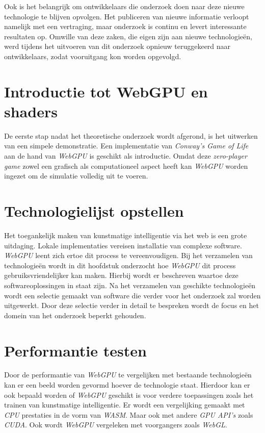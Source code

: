 \bigbreak{}

Ook is het belangrijk om ontwikkelaars die onderzoek doen naar deze nieuwe technologie te blijven opvolgen. Het publiceren van nieuwe informatie verloopt namelijk met een vertraging, maar onderzoek is continu en levert interessante resultaten op. Omwille van deze zaken, die eigen zijn aan nieuwe technologieën, werd tijdens het uitvoeren van dit onderzoek opnieuw teruggekeerd naar ontwikkelaars, zodat vooruitgang kon worden opgevolgd.

\section{Introductie tot WebGPU en shaders}

De eerste stap nadat het theoretische onderzoek wordt afgerond, is het uitwerken van een simpele demonstratie. Een implementatie van \textit{Conway's Game of Life} aan de hand van \textit{WebGPU} is geschikt als introductie. Omdat deze 
\textit{zero-player game} zowel een grafisch als computationeel aspect heeft kan \textit{WebGPU} worden ingezet om de simulatie volledig uit te voeren.

\section{Technologielijst opstellen}

Het toegankelijk maken van kunstmatige intelligentie via het web is een grote uitdaging. Lokale implementaties vereisen installatie van complexe software. \textit{WebGPU} leent zich ertoe dit process te vereenvoudigen. Bij het verzamelen van technologieën wordt in dit hoofdstuk onderzocht hoe \textit{WebGPU} dit process ge\-bruiks\-vrien\-de\-lij\-ker kan maken. Hierbij wordt er beschreven waartoe deze softwareoplossingen in staat zijn. Na het verzamelen van geschikte technologieën wordt een selectie gemaakt van software die verder voor het onderzoek zal worden uitgewerkt. Door deze selectie verder in detail te bespreken wordt de focus en het domein van het onderzoek beperkt gehouden.

\section{Performantie testen}

Door de performantie van \textit{WebGPU} te vergelijken met bestaande technologieën kan er een beeld worden gevormd hoever de technologie staat. Hierdoor kan er ook bepaald worden of \textit{WebGPU} geschikt is voor verdere toepassingen zoals het trainen van kunstmatige intelligentie. Er wordt een vergelijking gemaakt met \textit{CPU} prestaties in de vorm van \textit{WASM}. Maar ook met andere \textit{GPU API's} zoals \textit{CUDA}. Ook wordt \textit{WebGPU} vergeleken met voorgangers zoals \textit{WebGL}.

